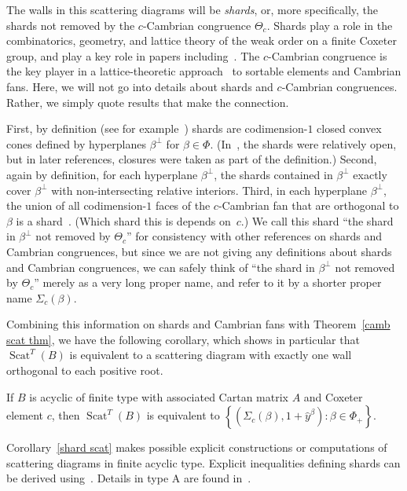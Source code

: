 \documentclass[ALCO,ThmDefs,Unicode,epreuves]{cedram}
\DeclareMathOperator{\Scat}{Scat}
\newcommand{\newword}[1]{\emph{#1}}
\newcommand{\set}[1]{{\left\lbrace #1 \right\rbrace}}
\newcommand{\hy}{\hat{y}}
\begin{document}
The walls in this scattering diagrams will be \newword{shards}, or, more specifically, the shards not removed by the $c$-Cambrian congruence $\Theta_c$.
Shards play a role in the combinatorics, geometry, and lattice theory of the weak order on a finite Coxeter group, and play a key role in papers including~\cite{bancroft,BCHT,petersen,hyperplane,hplanedim,congruence,sort_camb,shardint}.
The $c$-Cambrian congruence is the key player in a lattice-theoretic approach~\cite{cambrian,sort_camb} to sortable elements and Cambrian fans.
Here, we will not go into details about shards and $c$-Cambrian congruences.
Rather, we simply quote results that make the connection.

First, by definition (see for example~\cite[Section~3]{shardint}) shards are \mbox{codimension-$1$} closed convex cones defined by hyperplanes $\beta^\perp$ for $\beta\in\Phi$.
(In~\cite{hyperplane,hplanedim}, the shards were relatively open, but in later references, closures were taken as part of the definition.)
Second, again by definition, for each hyperplane $\beta^\perp$, the shards contained in $\beta^\perp$ exactly cover $\beta^\perp$ with non-intersecting relative interiors.
Third, in each hyperplane $\beta^\perp$, the union of all codimension-$1$ faces of the $c$-Cambrian fan that are orthogonal to $\beta$ is a shard~\cite[Proposition~8.15]{shardint}.
(Which shard this is depends on~$c$.)
We call this shard ``the shard in $\beta^\perp$ not removed by $\Theta_c$'' for consistency with other references on shards and Cambrian congruences, but since we are not giving any definitions about shards and Cambrian congruences, we can safely think of ``the shard in $\beta^\perp$ not removed by $\Theta_c$'' merely as a very long proper name, and refer to it by a shorter proper name $\Sigma_c(\beta)$.

Combining this information on shards and Cambrian fans with Theorem~\ref{camb scat thm}, we have the following corollary, which shows in particular that $\Scat^T(B)$ is equivalent to a scattering diagram with exactly one wall orthogonal to each positive root.

\begin{coro}\label{shard scat}
If $B$ is acyclic of finite type with associated Cartan matrix $A$ and Coxeter element $c$, then $\Scat^T(B)$ is equivalent to $\set{(\Sigma_c(\beta),1+\hy^\beta):\beta\in\Phi_+}$.
\end{coro}


Corollary~\ref{shard scat} makes possible explicit constructions or computations of scattering diagrams in finite acyclic type.
Explicit inequalities defining shards can be derived using~\cite[Lemma~3.7]{congruence}.
Details in type A are found in~\cite{bancroft,petersen}.
\end{document}
